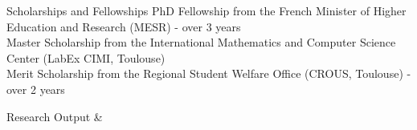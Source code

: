 \documentclass[a4paper,12pt]{article}
\begin{document}
\begin{sect}{Scholarships and Fellowships}
     {PhD Fellowship from the French Minister of Higher Education and Research (MESR) - over 3 years}
 \\
 
     {Master Scholarship from the International Mathematics and Computer Science Center (LabEx CIMI, Toulouse)}
 \\
     
     {Merit Scholarship from the Regional Student Welfare Office (CROUS, Toulouse) - over 2 years}
\end{sect}

\newpage
\begin{sect}[]{Research Output}
  & 
\end{sect}%
\vspace{-\baselineskip}
\nocite{*}%
\printbibliography[heading=none, type=unpublished]
\printbibliography[heading=none, nottype=misc,nottype=unpublished]
\printbibliography[heading=none, nottype=unpublished, subtype=talk]
\end{document}
